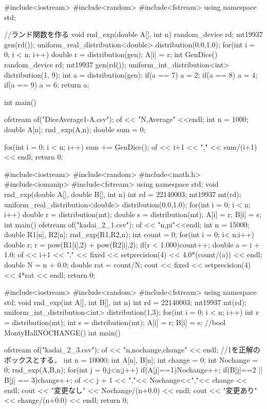 \documentclass[fleqn, a4paper. 12pt]{ltjsarticle} %
\begin{document}
\begin{cppcode}
  #include<iostream>
#include<random>
#include<fstream>
using namespace std;

//ランド関数を作る
void rnd_exp(double A[], int n){
    random_device rd;
    mt19937 gen(rd());
    uniform_real_distribution<double> distribution(0.0,1.0);
    for(int i = 0; i < n; i++){
        double r = distribution(gen);
        A[i] = r;
    }
}
int GenDice(){
    random_device rd;
    mt19937 gen(rd());
    uniform_int_distribution<int> distribution(1, 9);
    int a = distribution(gen);
    if(a == 7) a = 2;
    if(a == 8) a = 4;
    if(a == 9) a = 6;
    return a;
}

int main(){
    ofstream of("DiceAverage1-A.csv");
    of << "N,Average" <<endl; 
    int n = 1000;
    double A[n];
    rnd_exp(A,n);
    double sum = 0;

    for(int i = 0; i < n; i++){
        sum += GenDice();
        of << i+1 << "," << sum/(i+1) << endl;
    }
    return 0;
}
\end{cppcode}
\begin{cppcode}
  #include<iostream>
#include<random>
#include<math.h>
#include<iomanip>
#include<fstream>
using namespace std;
void rnd_exp(double A[], double B[], int n){
    int rd = 22140003;
    mt19937 mt(rd);
    uniform_real_distribution<double> distribution(0.0,1.0);
    for(int i = 0; i < n; i++){
        double r = distribution(mt);
        double s = distribution(mt);
        A[i] = r;
        B[i] = s;
    }
}
int main(){
    ofstream of("kadai_2_1.csv");
    of << "n,pi"<<endl;
    int n = 15000;
    double R1[n], R2[n];
    rnd_exp(R1,R2,n);
    int count = 0;
    for(int i = 0; i< n;i++){
        double r;
        r = pow(R1[i],2) + pow(R2[i],2);
        if(r < 1.000)count++;
        double a = i + 1.0;
        of << i+1 << "," << fixed << setprecision(4) << 4.0*(count/(a)) << endl;
    }
    double N = n + 0.0;
    double rat = count/N;
    cout << fixed << setprecision(4) << 4*rat << endl;
    return 0;
}
\end{cppcode}
\begin{cppcode}
  #include<iostream>
#include<random>
#include<fstream>
using namespace std;
void rnd_exp(int A[], int B[], int n){
    int rd = 22140003;
    mt19937 mt(rd);
    uniform_int_distribution<int> distribution(1,3);
    for(int i = 0; i < n; i++){
        int r = distribution(mt);
        int s = distribution(mt);
        A[i] = r;
        B[i] = s;
    }
}
//bool MontyHallNOCHANGE(){}
int main(){
    ofstream of("kadai_2_3.csv");
    of << "n,nochange,change" << endl;
    //1を正解のボックスとする．
    int n = 10000;
    int A[n], B[n];
    int change = 0;
    int Nochange = 0;
    rnd_exp(A,B,n);
    for(int j = 0;j<n;j++){
        if(A[j]==1)Nochange++;
        if(B[j]==2 || B[j] == 3)change++;
        of << j + 1 << ","<< Nochange<<","<< change << endl;
    }
    cout << "変更なし" << Nochange/(n+0.0) << endl;
    cout << "変更あり" << change/(n+0.0) << endl;
    return 0;
    
}
\end{cppcode}
\end{document}
